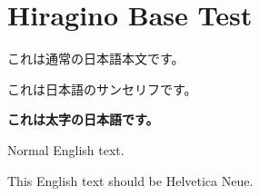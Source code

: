\documentclass{ltjsarticle}
\begin{document}
\section{Hiragino Base Test}

これは通常の日本語本文です。

\textsf{これは日本語のサンセリフです。}

\textbf{これは太字の日本語です。}

Normal English text.

\textsf{This English text should be Helvetica Neue.}
\end{document}
